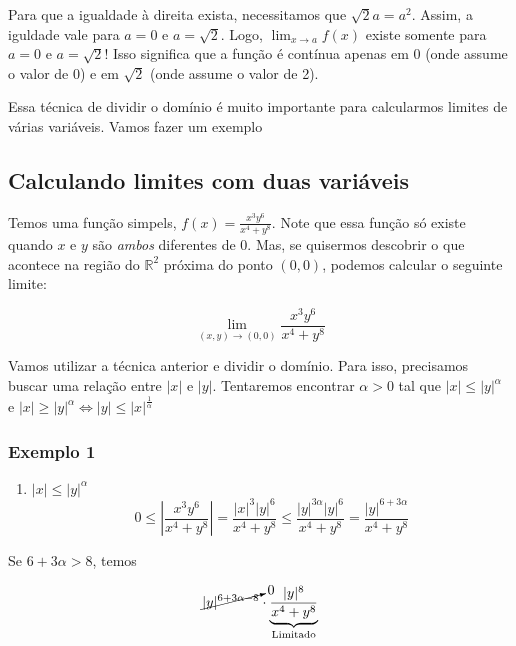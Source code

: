 \documentclass[
  portuguese,
  letterpaper,
  DIV=11,
  numbers=noendperiod]{scrreport}
\providecommand{\tightlist}{%
  \setlength{\itemsep}{0pt}\setlength{\parskip}{0pt}}
\begin{document}
Para que a igualdade à direita exista, necessitamos que
\(\sqrt{2}a = a^2\). Assim, a iguldade vale para \(a=0\) e
\(a=\sqrt{2}\). Logo, \(\lim_{x\rightarrow a} f(x)\) existe somente para
\(a=0\) e \(a=\sqrt{2}\)! Isso significa que a função é contínua apenas
em \(0\) (onde assume o valor de 0) e em \(\sqrt{2}\) (onde assume o
valor de 2).

Essa técnica de dividir o domínio é muito importante para calcularmos
limites de várias variáveis. Vamos fazer um exemplo

\subsection{Calculando limites com duas
variáveis}\label{calculando-limites-com-duas-variuxe1veis}

Temos uma função simpels, \(f(x) = \frac{x^3y^6}{x^4+y^8}\). Note que
essa função só existe quando \(x\) e \(y\) são \emph{ambos} diferentes
de 0. Mas, se quisermos descobrir o que acontece na região do
\(\mathbb{R}^2\) próxima do ponto \((0,0)\), podemos calcular o seguinte
limite:

\[
\lim_{(x,y) \rightarrow (0,0)} \frac{x^3y^6}{x^4+y^8}
\]

Vamos utilizar a técnica anterior e dividir o domínio. Para isso,
precisamos buscar uma relação entre \(\lvert x \rvert\) e
\(\lvert y \rvert\). Tentaremos encontrar \(\alpha > 0\) tal que
\(\lvert x \rvert \leq \lvert y \rvert^\alpha\) e
\(\lvert x \rvert \geq \lvert y \rvert^{\alpha} \Leftrightarrow \lvert y \rvert \leq \lvert x \rvert^{\frac{1}{\alpha}}\)

\subsubsection{Exemplo 1}\label{exemplo-1}

\begin{enumerate}
\def\labelenumi{\arabic{enumi}.}
\tightlist
\item
  \(\lvert x \rvert \leq \lvert y \rvert^{\alpha}\) \[
  0 \leq \left\lvert \frac{x^3y^6}{x^4+y^8} \right\rvert = \frac{\lvert x \rvert^3 \lvert y \rvert^6}
  {x^4+y^8} \leq \frac{\lvert y \rvert ^{3\alpha} \lvert y \rvert^6}{x^4 + y^8} =
  \frac{\lvert y \rvert^{6+3\alpha}}{x^4 + y^8}
  \]
\end{enumerate}

Se \(6+3\alpha > 8\), temos

\[
\cancelto{0}{\lvert y \rvert^{6+3\alpha-8}} \cdot
\underbrace{\frac{\lvert y \rvert^{8}}{x^4+y^8}}_{\text{Limitado}}
\]
\end{document}
